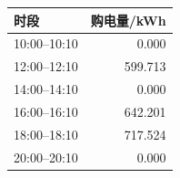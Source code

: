\begin{tabular}{lr}
\toprule
时段 & 购电量/kWh \\
\midrule
10:00--10:10 & 0.000 \\
12:00--12:10 & 599.713 \\
14:00--14:10 & 0.000 \\
16:00--16:10 & 642.201 \\
18:00--18:10 & 717.524 \\
20:00--20:10 & 0.000 \\
\bottomrule
\end{tabular}
